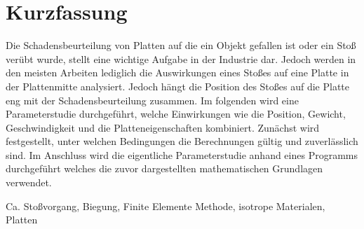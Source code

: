 \chapter*{Kurzfassung} 


Die Schadensbeurteilung von Platten auf die ein Objekt gefallen ist oder ein Stoß verübt wurde, stellt eine wichtige Aufgabe in der Industrie dar. Jedoch werden in den meisten Arbeiten lediglich die Auswirkungen eines Stoßes auf eine Platte in der Plattenmitte analysiert. Jedoch hängt die Position des Stoßes auf die Platte eng mit der Schadensbeurteilung zusammen. Im folgenden wird eine Parameterstudie durchgeführt, welche Einwirkungen wie die Position, Gewicht, Geschwindigkeit und die Platteneigenschaften kombiniert. Zunächst wird festgestellt, unter welchen Bedingungen die Berechnungen gültig und zuverlässlich sind. Im Anschluss wird die eigentliche Parameterstudie anhand eines Programms durchgeführt welches die zuvor dargestellten mathematischen Grundlagen verwendet.

\begin{keywords}
Ca. Stoßvorgang, Biegung, Finite Elemente Methode, isotrope Materialen, Platten
\end{keywords}